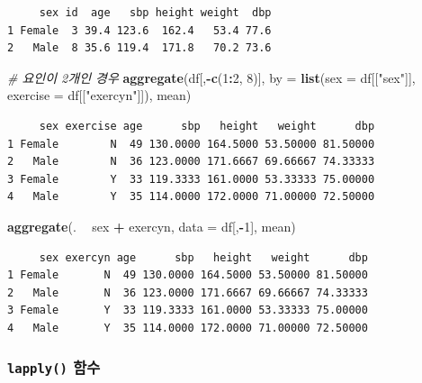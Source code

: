 \documentclass[
  11pt,
]{krantz}
\newenvironment{Shaded}{\begin{snugshade}}{\end{snugshade}}
\newcommand{\CommentTok}[1]{\textcolor[rgb]{0.37,0.37,0.37}{\textit{#1}}}
\newcommand{\DataTypeTok}[1]{\textcolor[rgb]{0.27,0.27,0.27}{#1}}
\newcommand{\DecValTok}[1]{\textcolor[rgb]{0.06,0.06,0.06}{#1}}
\newcommand{\KeywordTok}[1]{\textcolor[rgb]{0.27,0.27,0.27}{\textbf{#1}}}
\newcommand{\NormalTok}[1]{#1}
\newcommand{\OperatorTok}[1]{\textcolor[rgb]{0.43,0.43,0.43}{\textbf{#1}}}
\newcommand{\StringTok}[1]{\textcolor[rgb]{0.5,0.5,0.5}{#1}}
\begin{document}
\begin{verbatim}
     sex id  age   sbp height weight  dbp
1 Female  3 39.4 123.6  162.4   53.4 77.6
2   Male  8 35.6 119.4  171.8   70.2 73.6
\end{verbatim}

\begin{Shaded}
\begin{Highlighting}[]
\CommentTok{# 요인이 2개인 경우}
\KeywordTok{aggregate}\NormalTok{(df[,}\OperatorTok{-}\KeywordTok{c}\NormalTok{(}\DecValTok{1}\OperatorTok{:}\DecValTok{2}\NormalTok{, }\DecValTok{8}\NormalTok{)], }
          \DataTypeTok{by =} \KeywordTok{list}\NormalTok{(}\DataTypeTok{sex =}\NormalTok{ df[[}\StringTok{"sex"}\NormalTok{]], }\DataTypeTok{exercise =}\NormalTok{ df[[}\StringTok{"exercyn"}\NormalTok{]]), }
\NormalTok{          mean)}
\end{Highlighting}
\end{Shaded}

\begin{verbatim}
     sex exercise age      sbp   height   weight      dbp
1 Female        N  49 130.0000 164.5000 53.50000 81.50000
2   Male        N  36 123.0000 171.6667 69.66667 74.33333
3 Female        Y  33 119.3333 161.0000 53.33333 75.00000
4   Male        Y  35 114.0000 172.0000 71.00000 72.50000
\end{verbatim}

\begin{Shaded}
\begin{Highlighting}[]
\KeywordTok{aggregate}\NormalTok{(. }\OperatorTok{~}\StringTok{ }\NormalTok{sex }\OperatorTok{+}\StringTok{ }\NormalTok{exercyn, }
          \DataTypeTok{data =}\NormalTok{ df[,}\OperatorTok{-}\DecValTok{1}\NormalTok{], }
\NormalTok{          mean)}
\end{Highlighting}
\end{Shaded}

\begin{verbatim}
     sex exercyn age      sbp   height   weight      dbp
1 Female       N  49 130.0000 164.5000 53.50000 81.50000
2   Male       N  36 123.0000 171.6667 69.66667 74.33333
3 Female       Y  33 119.3333 161.0000 53.33333 75.00000
4   Male       Y  35 114.0000 172.0000 71.00000 72.50000
\end{verbatim}

\normalsize

\hypertarget{lapply}{%
\subsubsection*{\texorpdfstring{\texttt{lapply()} 함수}{lapply() 함수}}\label{lapply}}
\end{document}

